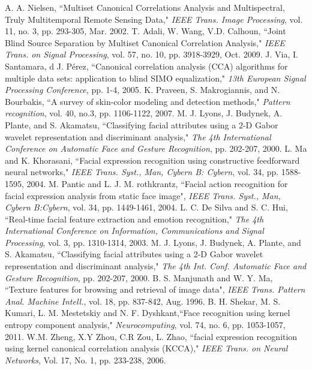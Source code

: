 \documentclass[journal]{IEEEtran}
\begin{document}
\begin{thebibliography}{1}
A. A. Nielsen, ``Multiset Canonical Correlations Analysis and Multispectral, Truly Multitemporal Remote Sensing Data," \emph{IEEE Trans. Image Processing}, vol. 11, no. 3, pp. 293-305, Mar. 2002.
T. Adali, W. Wang, V.D. Calhoun, ``Joint Blind Source Separation by Multiset Canonical Correlation Analysis," \emph{IEEE Trans. on  Signal Processing}, vol. 57, no. 10, pp. 3918-3929, Oct. 2009.
J. Via, I. Santamara, d J. Pérez, ``Canonical correlation analysis (CCA) algorithms for multiple data sets: application to blind SIMO equalization," \emph{13th European Signal Processing Conference}, pp. 1-4, 2005.
K. Praveen, S. Makrogiannis, and N. Bourbakis, ``A survey of skin-color modeling and detection methods," \emph{Pattern recognition}, vol. 40, no.3, pp. 1106-1122, 2007.
M. J. Lyons, J. Budynek, A. Plante, and S. Akamatsu, ``Classifying facial attributes using a 2-D Gabor wavelet representation and discriminant analysis," \emph{The 4th International Conference on Automatic Face and Gesture
Recognition}, pp. 202-207, 2000.
L. Ma and K. Khorasani, ``Facial expression recognition using constructive feedforward neural networks," \emph{IEEE Trans. Syst., Man, Cybern B: Cybern}, vol. 34, pp. 1588-1595, 2004.
M. Pantic and L. J. M. rothkrantz, ``Facial action recognition for facial expression analysis from static face image", \emph{IEEE Trans. Syst., Man, Cybern B:Cybern}, vol. 34, pp. 1449-1461, 2004.
L. C. De Silva and S. C. Hui, ``Real-time facial feature extraction and emotion recognition," \emph{The 4th International Conference on Information, Communications and Signal Processing}, vol. 3, pp. 1310-1314, 2003.
M. J. Lyons, J. Budynek, A. Plante, and S. Akamatsu, ``Classifying facial attributes using a 2-D Gabor wavelet representation and discriminant analysis," \emph{The 4th Int. Conf. Automatic Face and Gesture Recognition}, pp. 202-207, 2000.
B. S. Manjunath and W. Y. Ma, ``Texture features for browsing and retrieval of image data", \emph{IEEE Trans. Pattern Anal. Machine Intell.}, vol. 18, pp. 837-842, Aug. 1996.
B. H. Shekar, M. S. Kumari, L. M. Mestetskiy and N. F. Dyshkant,``Face recognition using kernel entropy component analysis," \emph{Neurocomputing}, vol. 74, no. 6, pp. 1053-1057, 2011.
W.M. Zheng, X.Y Zhou, C.R Zou, L. Zhao, ``facial expression recognition using kernel canonical correlation analysis (KCCA)," \emph{IEEE Trans. on Neural Networks}, Vol. 17, No. 1, pp. 233-238, 2006.

\end{thebibliography}
\end{document}
